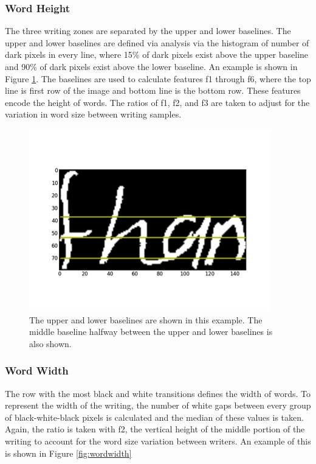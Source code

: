 \documentclass[paper=a4, fontsize=11pt]{scrartcl} %
\numberwithin{equation}{section} %
\numberwithin{figure}{section} %
\numberwithin{table}{section} %
\begin{document}
\subsubsection{Word Height}
The three writing zones are separated by the upper and lower
baselines. The upper and lower baselines are defined via analysis via
the histogram of number of dark pixels in every line, where 15\% of
dark pixels exist above the upper baseline and 90\% of dark pixels
exist above the lower baseline. An example is shown in Figure \ref{fig:wordheight}. The baselines are used to calculate
features f1 through f6, where the top line is first row of the image and
bottom line is the bottom row. These features encode the height of
words. The ratios of f1, f2, and f3 are taken to adjust for the
variation in word size between writing samples.

\begin{figure}
  \centering \includegraphics{wordheight.png}
  \caption{The upper and lower baselines are shown in this example. The middle baseline halfway between the upper and lower baselines is also shown.}
  \label{fig:wordheight}
\end{figure}

\subsubsection{Word Width}
The row with the most black and white transitions defines the width of words. To represent the width of the writing, the number of white gaps between every group of black-white-black pixels is calculated and the median of these values is taken. Again, the ratio is taken with f2, the vertical height of the middle portion of the writing to account for the word size variation between writers. An example of this is shown in Figure \ref{fig:wordwidth}
\end{document}
